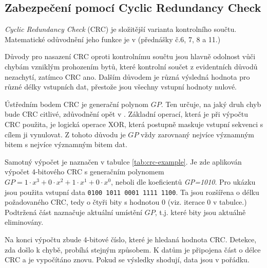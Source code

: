 \subsection{Zabezpečení pomocí Cyclic Redundancy Check}
\label{subsec:crc}
\textit{Cyclic Redundancy Check} (CRC) je složitější varianta kontrolního součtu. Matematické odůvodnění jeho funkce je v \cite{crc-prednasky} (přednášky č.6, 7, 8 a 11.)

Důvody pro nasazení CRC oproti kontrolnímu součtu jsou hlavně odolnost vůči chybám vzniklým prohozením bytů, které kontrolní součet z evidentních důvodů nezachytí, zatímco CRC ano. Dalším důvodem je různá výsledná hodnota pro různé délky vstupních dat, přestože jsou všechny vstupní hodnoty nulové.

Ústředním bodem CRC je generační polynom $GP$. Ten určuje, na jaký druh chyb bude CRC citlivé, zdůvodnění opět v \cite{crc-prednasky}. Základní operací, která je při výpočtu CRC použita, je logická operace XOR, která postupně maskuje vstupní sekvenci s cílem ji vynulovat. Z tohoto důvodu je $GP$ vždy zarovnaný nejvíce významným bitem s nejvíce významným bitem dat.

Samotný výpočet je naznačen v tabulce \ref{tab:crc-example}. Je zde aplikován výpočet 4-bitového CRC s generačním polynomem $GP=1 \cdot x^3 + 0 \cdot x^2 + 1 \cdot x^1 + 0 \cdot x^0$, neboli dle koeficientů \textit{GP=1010}. Pro ukázku jsou použita vstupní data \texttt{0100 1011 0001 1111 1100}. Ta jsou rozšířena o délku požadovaného CRC, tedy o čtyři bity s hodnotou 0 (viz. iterace 0 v tabulce.) Podtržená část naznačuje aktuální umístění $GP$, t.j. které bity jsou aktuálně eliminovány.

Na konci výpočtu zbude 4-bitové číslo, které je hledaná hodnota CRC. Detekce, zda došlo k chybě, probíhá stejným způsobem. K datům je připojena část o délce CRC a je vypočítáno znovu. Pokud se výsledky shodují, data jsou v pořádku.

